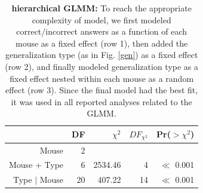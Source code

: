 \vspace{0.5in}

\begin{table}[h!]
\label{hiertab}
\caption{\textbf{hierarchical GLMM:} To reach the appropriate complexity of model, we first modeled correct/incorrect answers as a function of each mouse as a fixed effect (row 1), then added the generalization type (as in Fig. \ref{gen}) as a fixed effect (row 2), and finally modeled generalization type as a fixed effect nested within each mouse as a random effect (row 3). Since the final model had the best fit, it was used in all reported analyses related to the GLMM.}
\begin{tabularx}{\linewidth}{rrrrr}
  \hline
 & DF & $\chi^2$ & $DF_{\chi^2}$ & Pr($>\chi^2$) \\ 
  \hline
Mouse & 2 &  &  &  \\ 
  Mouse + Type & 6 & 2534.46 & 4 & $\ll$ 0.001 \\ 
  Type $|$ Mouse & 20 & 407.22 & 14 & $\ll$ 0.001 \\ 
   \hline
\end{tabularx}

\end{table}
